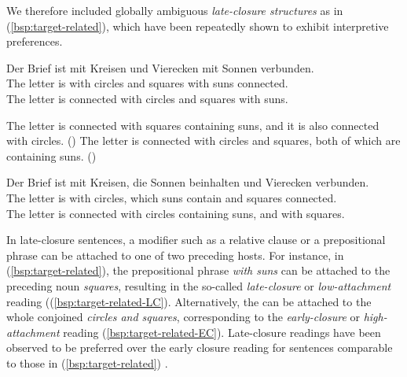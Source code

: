 \documentclass[fleqn,reqno,10pt,draft]{article}
\newcommand{\lc}{\acro{lc}}
\newcommand{\ec}{\acro{ec}}
\begin{document}
We therefore included globally ambiguous \emph{late-closure
  structures} as in (\ref{bsp:target-related}), which have been
repeatedly shown to exhibit interpretive preferences.
\begin{exe}
\ex \gll Der Brief ist mit Kreisen und Vierecken mit Sonnen
  verbunden. \label{bsp:target-related}\\
The letter is with circles and squares with suns connected.\\
The letter is connected with circles and squares with suns.
\begin{xlist}
  \ex \label{bsp:target-related-LC} The letter is connected with squares containing suns, and it is
    also connected with circles. \hfill{(\lc)}
  \ex \label{bsp:target-related-EC} The letter is connected with circles and squares, both of which
    are containing suns.  \hfill{(\ec)} 
\end{xlist}

\ex \gll Der Brief ist mit Kreisen, die Sonnen beinhalten und Vierecken
  verbunden. \label{bsp:target-related2}\\
The letter is with circles, which suns contain and squares connected.\\
The letter is connected with circles containing suns, and with squares.

\end{exe}
In late-closure sentences, a modifier such as a relative clause or a 
prepositional phrase can be attached to one of two
preceding hosts. For instance, in (\ref{bsp:target-related}), the
prepositional phrase \emph{with suns} can be attached to the preceding
noun \emph{squares}, resulting in the so-called \emph{late-closure} or
\emph{low-attachment} reading ((\ref{bsp:target-related-LC}). Alternatively, 
the  can be attached to the whole conjoined 
\emph{circles and squares}, corresponding to the \emph{early-closure}
or \emph{high-attachment} reading (\ref{bsp:target-related-EC}).
Late-closure readings have been observed to be preferred over the early 
closure reading for sentences comparable to those in (\ref{bsp:target-related})
\citep[e.g.][]{Frazier87,Frazier82}.
\end{document}
